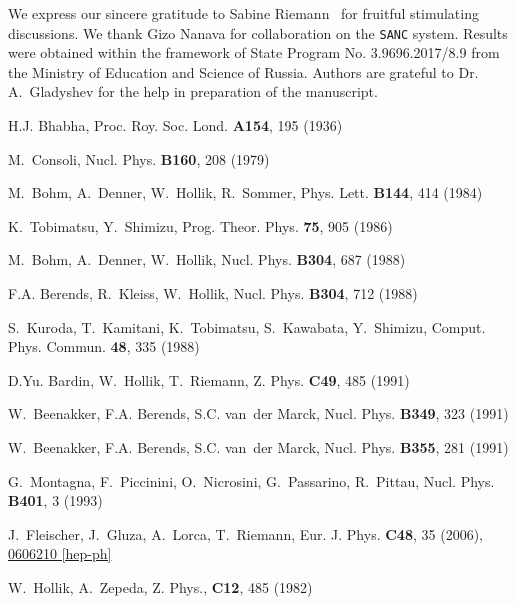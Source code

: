 \documentclass[%
 reprint,
amsmath,
amssymb,
 aps,
 prb,
 floatfix,
]{revtex4-1}
\begin{document}
\begin{acknowledgments}
We express our sincere gratitude to Sabine Riemann~\cite{ReportSR} for fruitful 
stimulating discussions.
We thank Gizo Nanava for collaboration on the {\tt SANC} system.
Results were obtained within the framework of State Program 
No. 3.9696.2017/8.9 from the Ministry of Education and Science of Russia.
Authors are grateful to Dr. A.~Gladyshev for the help in preparation of the manuscript.
\end{acknowledgments}

%

\begin{thebibliography}{30}

H.J. Bhabha, Proc. Roy. Soc. Lond. \textbf{A154}, 195 (1936)

M.~Consoli, Nucl. Phys. \textbf{B160}, 208 (1979)

M.~Bohm, A.~Denner, W.~Hollik, R.~Sommer, Phys. Lett. \textbf{B144}, 414 (1984)

K.~Tobimatsu, Y.~Shimizu, Prog. Theor. Phys. \textbf{75}, 905 (1986)

M.~Bohm, A.~Denner, W.~Hollik, Nucl. Phys. \textbf{B304}, 687 (1988)

F.A. Berends, R.~Kleiss, W.~Hollik, Nucl. Phys. \textbf{B304}, 712 (1988)

S.~Kuroda, T.~Kamitani, K.~Tobimatsu, S.~Kawabata, Y.~Shimizu, Comput. Phys.
  Commun. \textbf{48}, 335 (1988)

D.{\relax Yu}. Bardin, W.~Hollik, T.~Riemann, Z. Phys. \textbf{C49}, 485 (1991)

W.~Beenakker, F.A. Berends, S.C. van~der Marck, Nucl. Phys. \textbf{B349}, 323
  (1991)

W.~Beenakker, F.A. Berends, S.C. van~der Marck, Nucl. Phys. \textbf{B355}, 281
  (1991)

G.~Montagna, F.~Piccinini, O.~Nicrosini, G.~Passarino, R.~Pittau, Nucl. Phys.
  \textbf{B401}, 3 (1993)

J.~Fleischer, J.~Gluza, A.~Lorca, T.~Riemann, Eur. J. Phys. \textbf{C48}, 35
(2006),
\href{http://xxx.lanl.gov/abs/hep-ph/0606210}{0606210 [hep-ph]}

W.~Hollik, A.~Zepeda, Z. Phys., \textbf{C12}, 485 (1982)


\end{thebibliography}
\end{document}
